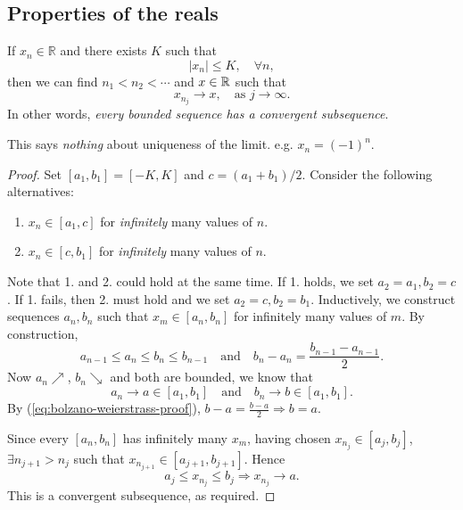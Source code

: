 \subsection{Properties of the reals}
\begin{theorem}\label{thm:bolzano-weierstrass}
    If $ x_n\in \mathbb{R} $ and there exists $K$ such that
    \[
        \left| x_n \right| \le K,\quad \forall n,
    \]
    then we can find $ n_1<n_2<\cdots $ and $x\in {\mathbb{R}}$ such that 
    \[
        x_{n_j} \to x, \quad \text{as } j\to \infty.
    \]
    In other words, \textit{every bounded sequence has a convergent subsequence}.
\end{theorem}
\begin{remark}
    This says \textit{nothing} about uniqueness of the limit. e.g. $x_n=(-1)^n$.
\end{remark}
\begin{proof}
    Set $ [a_1,b_1] = [-K,K] $ and $ c=(a_1+b_1)/2 $. Consider the following alternatives:
    \begin{enumerate}
        \item $ x_n\in [a_1,c] $ for \textit{infinitely} many values of $n$.
        \item $ x_n\in [c,b_1] $ for \textit{infinitely} many values of $n$.
    \end{enumerate}
    Note that 1. and 2. could hold at the same time. If 1. holds, we set $a_2=a_1, b_2=c$. If 1. fails, then 2. must hold and we set $a_2=c,b_2=b_1$. Inductively, we construct sequences $ a_n,b_n $ such that $ x_m\in [a_n,b_n] $ for infinitely many values of $m$. By construction, 
    \begin{equation}\label{eq:bolzano-weierstrass-proof}\tag{$*$}
        a_{n-1}\le a_n\le b_n\le b_{n-1}\quad\text{and}\quad b_n-a_n = \frac{b_{n-1}-a_{n-1}}{2}.
    \end{equation}
    Now $a_n \nearrow$, $b_n \searrow$ and both are bounded, we know that 
    \[
        a_n\to a\in [a_1,b_1] \quad \text{and}\quad b_n \to b\in [a_1,b_1].
    \]
    By (\ref{eq:bolzano-weierstrass-proof}), $ b-a=\frac{b-a}{2} \Rightarrow b=a $.

    Since every $[a_n,b_n]$ has infinitely many $x_m$, having chosen $ x_{n_j}\in [a_j,b_j] $, $ \exists n_{j+1}>n_j $ such that $ x_{n_{j+1}}\in [a_{j+1},b_{j+1}] $. Hence 
    \[
        a_j\le x_{n_j}\le b_j \Rightarrow x_{n_j}\to a.
    \]
    This is a convergent subsequence, as required.
\end{proof}

